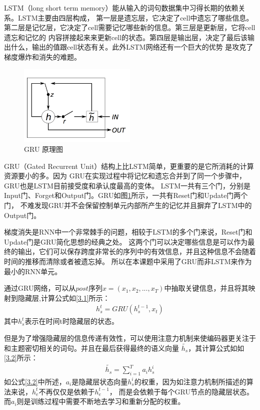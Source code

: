 \documentclass[supercite]{HustGraduPaper}
\theoremstyle{definition}
\begin{document}
LSTM\cite{gers1999learning}（long short term memory）能从输入的词句数据集中习得长期的依赖关系。LSTM主要由四层构成，
第一层是遗忘层，它决定了cell中遗忘了哪些信息。第二层是记忆层，它决定了cell需要记忆哪些新的信息。第三层是更新层，它将cell遗忘和记忆的
内容拼接起来来更新cell的状态。第四层是输出层，决定了最后该输出什么，输出的值跟cell状态有关。此外LSTM网络还有一个巨大的优势
是攻克了梯度爆炸和消失的难题。

\begin{figure}[H] %
  \centering %
  \includegraphics[width=0.5\textwidth]{images/GRU.png} %
  \caption{GRU 原理图} %
  \label{Fig.GRU} %
\end{figure}

GRU\cite{dey2017gate}（Gated Recurrent Unit）结构上比LSTM简单，更重要的是它所消耗的计算资源要小的多。因为
GRU在实现过程中将记忆和遗忘合并到了同一个步骤中，GRU也是LSTM目前接受度和承认度最高的变体。
LSTM一共有三个门，分别是Input门、Forget和Output门。GRU如图\ref{Fig.GRU}所示，一共有Reset门和Update门两个门，
不难发现GRU并不会保留控制单元内部所产生的记忆并且摒弃了LSTM中的Output门。

梯度消失是RNN中一个非常棘手的问题，相较于LSTM的多个门来说，Reset门和Update门是GRU简化思想的经典之处。
这两个门可以决定哪些信息是可以作为最终的输出，它们可以保存跨度非常长的序列中的有效信息，并且这种信息不会随着时间的推移而清除或者被遗忘掉。
所以在本课题中采用了GRU而非LSTM来作为最小的RNN单元。

通过GRU网络，可以从$post$序列$x = (x_1,x_2,...,x_T)$中抽取关键信息，并且将其映射到隐藏层,计算公式如\ref{3.1}所示：
\begin{align}
  h_s^t = GRU(h_s^{t-1},x_t) \label{3.1}
\end{align}
其中$h_s^t$表示在时间t时隐藏层的状态。

但是为了增强隐藏层的信息传递有效性，可以使用注意力机制来使编码器更关注于和主题密切相关的词句。并且在最后获得最终的语义向量
$\widetilde{h_s}$，其计算公式如如\ref{3.2}所示：
\begin{align}
  \widetilde{h_s} = \sum_{i=1}^{T}a_i h_s^i \label{3.2}
\end{align}
如公式\ref{3.2}中所述，$a_i$是隐藏层状态向量$h_s^i$的权重，因为如注意力机制所描述的算法来说，$h_e^t$不再仅仅是依赖于$h_e^{t-1}$，
而是会依赖于每个GRU节点的隐藏层状态。而$a_i$则是训练过程中需要不断地去学习和重新分配的权重。
\end{document}
